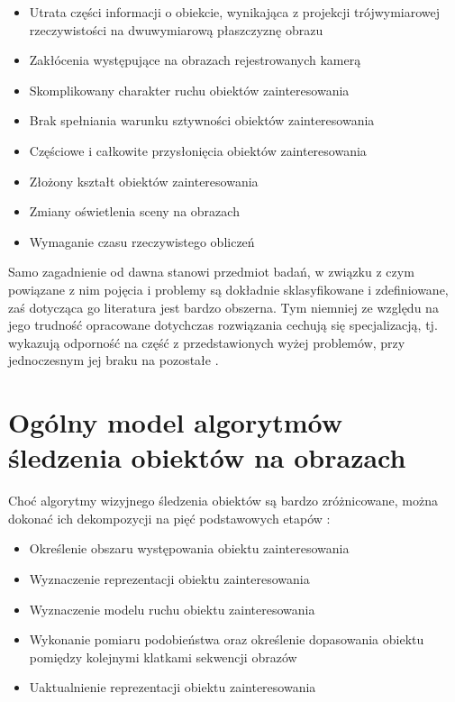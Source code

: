 \begin{itemize}

	\item Utrata części informacji o obiekcie, wynikająca z projekcji trójwymiarowej rzeczywistości na dwuwymiarową płaszczyznę obrazu
	\item Zakłócenia występujące na obrazach rejestrowanych kamerą
	\item Skomplikowany charakter ruchu obiektów zainteresowania
	\item Brak spełniania warunku sztywności obiektów zainteresowania
	\item Częściowe i całkowite przysłonięcia obiektów zainteresowania
	\item Złożony kształt obiektów  zainteresowania
	\item Zmiany oświetlenia sceny na obrazach
	\item Wymaganie czasu rzeczywistego obliczeń

\end{itemize}  

Samo zagadnienie od dawna stanowi przedmiot badań, w związku z czym powiązane z nim pojęcia i problemy są dokładnie sklasyfikowane i zdefiniowane, zaś dotycząca go literatura jest bardzo obszerna. Tym niemniej ze względu na jego trudność opracowane dotychczas rozwiązania cechują się specjalizacją, tj. wykazują odporność na część z przedstawionych wyżej problemów, przy jednoczesnym jej braku na pozostałe \cite{Smeulders2010}.

\section{Ogólny model algorytmów śledzenia obiektów na obrazach}
\label{sec:Ogolny_model_algorytmow_sledzenia_obiektow_na_obrazach}

Choć algorytmy wizyjnego śledzenia obiektów są bardzo zróżnicowane, można dokonać ich dekompozycji na pięć podstawowych etapów \cite{Smeulders2010}:

\begin{itemize}
	\item Określenie obszaru występowania obiektu zainteresowania
	\item Wyznaczenie reprezentacji obiektu zainteresowania
	\item Wyznaczenie modelu ruchu obiektu zainteresowania
	\item Wykonanie pomiaru podobieństwa oraz określenie dopasowania obiektu pomiędzy kolejnymi klatkami sekwencji obrazów
	\item Uaktualnienie reprezentacji obiektu zainteresowania
\end{itemize}
 
